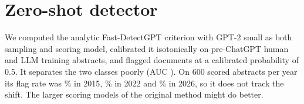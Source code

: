 \documentclass[11pt]{article}
\newcommand{\gptii}{\mbox{GPT-2}}
\begin{document}
\section{Zero-shot detector}
\label{app:fastdetect}
We computed the analytic Fast-DetectGPT criterion \citep{bao2024fastdetectgpt} with \gptii{} small as both sampling
and scoring model, calibrated it isotonically on  pre-ChatGPT human and
 LLM training abstracts, and flagged documents at a calibrated probability of
0.5. It separates the two classes poorly (AUC ). On 600 scored abstracts per year
its flag rate was \% in 2015, \% in
2022 and \% in 2026, so it does not track the shift. The larger scoring models
of the original method might do better.
\end{document}
